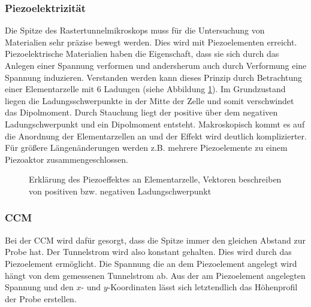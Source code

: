 \subsubsection{Piezoelektrizität}
Die Spitze des Rastertunnelmikroskops muss für die Untersuchung von Materialien sehr präzise bewegt werden. Dies wird mit Piezoelementen erreicht. Piezoelektrische Materialien haben die Eigenschaft, dass sie sich durch das Anlegen einer Spannung verformen und andersherum auch durch Verformung eine Spannung induzieren. Verstanden werden kann dieses Prinzip durch Betrachtung einer Elementarzelle mit 6 Ladungen (siehe Abbildung \ref{fig:piezo}). Im Grundzustand liegen die Ladungsschwerpunkte in der Mitte der Zelle und somit verschwindet das Dipolmoment. Durch Stauchung liegt der positive über dem negativen Ladungschwerpunkt und ein Dipolmoment entsteht. Makroskopisch kommt es auf die Anordnung der Elementarzellen an und der Effekt wird deutlich komplizierter. Für größere Längenänderungen werden z.B. mehrere Piezoelemente zu einem Piezoaktor zusammengeschlossen.

\begin{figure}[h]
  \centering
  \caption{Erklärung des Piezoeffektes an Elementarzelle, Vektoren beschreiben von positiven bzw. negativen Ladungschwerpunkt}
  \label{fig:piezo}
\end{figure}

\subsubsection{CCM}
Bei der CCM wird dafür gesorgt, dass die Spitze immer den gleichen Abstand zur Probe hat. Der Tunnelstrom wird also konstant gehalten. Dies wird durch das Piezoelement ermöglicht. Die Spannung die an dem Piezoelement angelegt wird hängt von dem gemessenen Tunnelstrom ab. Aus der am Piezoelement angelegten Spannung und den $x$- und $y$-Koordinaten lässt sich letztendlich das Höhenprofil der Probe erstellen.

